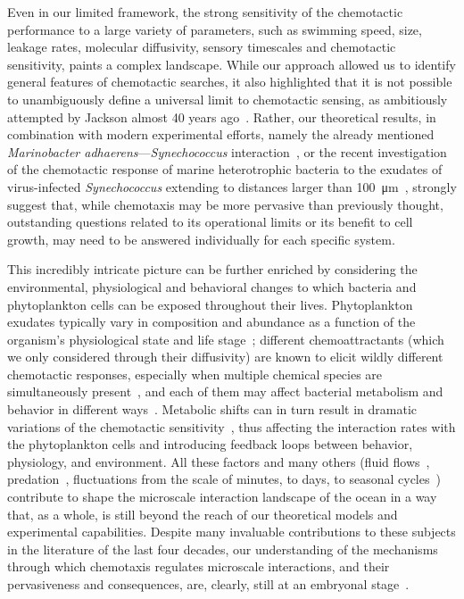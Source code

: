 \documentclass[9pt,twocolumn,twoside]{pnas-new}
\begin{document}
Even in our limited framework, the strong sensitivity of the chemotactic performance to a large variety of parameters, such as swimming speed, size, leakage rates, molecular diffusivity, sensory timescales and chemotactic sensitivity, paints a complex landscape. While our approach allowed us to identify general features of chemotactic searches, it also highlighted that it is not possible to unambiguously define a universal limit to chemotactic sensing, as ambitiously attempted by Jackson almost 40 years ago~\cite{jackson1987simulating}.
Rather, our theoretical results, in combination with modern experimental efforts, namely the already mentioned \textit{Marinobacter adhaerens}---\textit{Synechococcus} interaction~\cite{raina2023chemotaxis}, or the recent investigation of the chemotactic response of marine heterotrophic bacteria to the exudates of virus-infected \textit{Synechococcus} extending to distances larger than \SI{100}{\micro\m}~\cite{henshaw2023early}, strongly suggest that, while chemotaxis may be more pervasive than previously thought, outstanding questions related to its operational limits or its benefit to cell growth, may need to be answered individually for each specific system.

This incredibly intricate picture can be further enriched by considering the environmental, physiological and behavioral changes to which bacteria and phytoplankton cells can be exposed throughout their lives.
Phytoplankton exudates typically vary in composition and abundance as a function of the organism's physiological state and life stage~\cite{maranon2004significance,thornton2014dissolved,seymour2017zooming}; different chemoattractants (which we only considered through their diffusivity) are known to elicit wildly different chemotactic responses, especially when multiple chemical species are simultaneously present~\cite{clerc2023strong}, and each of them may affect bacterial metabolism and behavior in different ways~\cite{barak-gavish2023bacterial,stubbusch2023polysaccharide}.
Metabolic shifts can in turn result in dramatic variations of the chemotactic sensitivity~\cite{}, thus affecting the interaction rates with the phytoplankton cells and introducing feedback loops between behavior, physiology, and environment.
All these factors and many others (fluid flows~\cite{bowen1993simulating,blackburn1999influence,kiorboe2001marine,taylor2012tradeoffs}, predation~\cite{nielsen2021foraging}, fluctuations from the scale of minutes, to days, to seasonal cycles~\cite{bernhardt2020life,karin2021temporal,nguyen2021environmental}) contribute to shape the microscale interaction landscape of the ocean in a way that, as a whole, is still beyond the reach of our theoretical models and experimental capabilities. Despite many invaluable contributions to these subjects in the literature of the last four decades, our understanding of the mechanisms through which chemotaxis regulates microscale interactions, and their pervasiveness and consequences, are, clearly, still at an embryonal stage~\cite{seymour2024swimming}.
\end{document}
